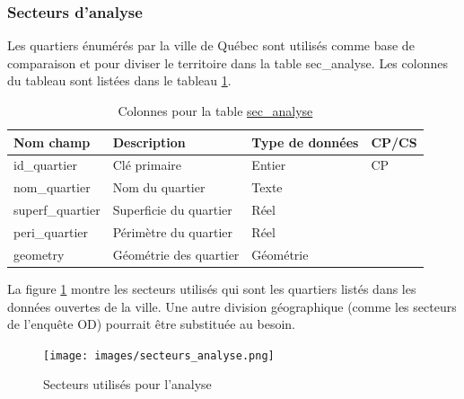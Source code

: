     \subsubsection{Secteurs d'analyse}
    Les quartiers énumérés par la ville de Québec sont utilisés comme base de comparaison et pour diviser le territoire dans la table sec\_analyse. Les colonnes du tableau sont listées dans le tableau \ref{tab:definition_sec_analyse}.
    \begin{table}[h]
       \centering
       \begin{tabular}{m{}|m{}m{}m{}}
            \hline
            Nom champ & Description & Type de données & CP/CS  \\
            \hline
            id\_quartier & Clé primaire & Entier & CP \\
            nom\_quartier & Nom du quartier & Texte & \\
            superf\_quartier & Superficie du quartier & Réel & \\
            peri\_quartier & Périmètre du quartier & Réel & \\
            geometry & Géométrie des quartier & Géométrie & \\
            \hline
       \end{tabular}
       \caption{Colonnes pour la table \underline{sec\_analyse}}
       \label{tab:definition_sec_analyse}
    \end{table}   
    La figure \ref{fig:sec-analyse} montre les secteurs utilisés qui sont les quartiers listés dans les données ouvertes de la ville. Une autre division géographique (comme les secteurs de l'enquête OD) pourrait être substituée au besoin.
    \begin{figure}[h]
        \centering
        \texttt{[image: images/secteurs\_analyse.png]}
        \caption{Secteurs utilisés pour l'analyse}
        \label{fig:sec-analyse}
    \end{figure}
    \FloatBarrier
    
